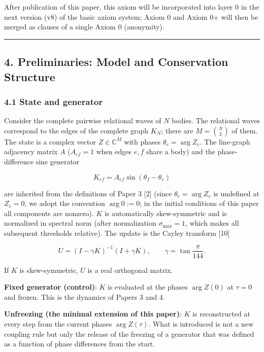 \documentclass[
  a4paper,
]{article}
\begin{document}
After publication of this paper, this axiom will be incorporated into
layer 0 in the next version (v8) of the basic axiom system; Axiom 0 and
Axiom 0+ will then be merged as clauses of a single Axiom 0 (anonymity).

\begin{center}\rule{0.5\linewidth}{0.5pt}\end{center}

\subsection{4. Preliminaries: Model and Conservation
Structure}\label{preliminaries-model-and-conservation-structure}

\subsubsection{4.1 State and generator}\label{state-and-generator}

Consider the complete pairwise relational waves of \(N\) bodies. The
relational waves correspond to the edges of the complete graph \(K_N\);
there are \(M=\binom N2\) of them. The state is a complex vector
\(Z\in\mathbb C^M\) with phases \(\theta_e=\arg Z_e\). The line-graph
adjacency matrix \(A\) (\(A_{ef}=1\) when edges \(e,f\) share a body)
and the phase-difference sine generator

\[
K_{ef}=A_{ef}\sin(\theta_f-\theta_e)
\]

are inherited from the definitions of Paper 3 {[}2{]} (since
\(\theta_e=\arg Z_e\) is undefined at \(Z_e=0\), we adopt the convention
\(\arg 0:=0\); in the initial conditions of this paper all components
are nonzero). \(K\) is automatically skew-symmetric and is normalized in
spectral norm (after normalization \(\sigma_{\max}=1\), which makes all
subsequent thresholds relative). The update is the Cayley transform
{[}10{]}

\[
U=(I-\gamma K)^{-1}(I+\gamma K),
\qquad
\gamma=\tan\frac{\pi}{144}.
\]

If \(K\) is skew-symmetric, \(U\) is a real orthogonal matrix.

\textbf{Fixed generator (control)}: \(K\) is evaluated at the phases
\(\arg Z(0)\) at \(\tau=0\) and frozen. This is the dynamics of Papers 3
and 4.

\textbf{Unfreezing (the minimal extension of this paper)}: \(K\) is
reconstructed at every step from the current phases \(\arg Z(\tau)\).
What is introduced is not a new coupling rule but only the release of
the freezing of a generator that was defined as a function of phase
differences from the start.
\end{document}
